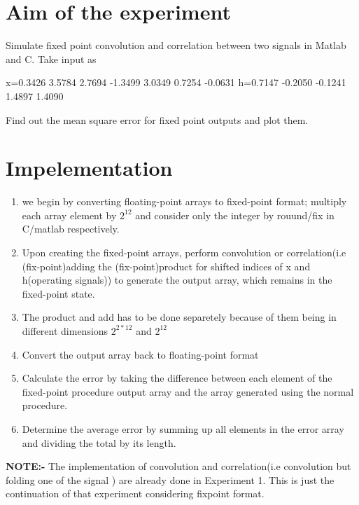 \documentclass[journal,12pt,onecolumn]{IEEEtran}
\theoremstyle{remark}
\begin{document}
\section{Aim of the experiment}
Simulate fixed point convolution and correlation between two signals in Matlab and C. Take input as

x={0.3426    3.5784    2.7694   -1.3499    3.0349    0.7254   -0.0631}
h={0.7147   -0.2050   -0.1241    1.4897    1.4090}

Find out the mean square error for fixed point outputs and plot them.
\section{Impelementation}
\begin{enumerate}
\item we begin by converting floating-point arrays to fixed-point format; multiply each array element by $2^{12}$ and consider only the integer by rouund/fix in C/matlab respectively.
\item Upon creating the fixed-point arrays, perform convolution or correlation(i.e (fix-point)adding the (fix-point)product for shifted indices of x and h(operating signals)) to generate the output array, which remains in the fixed-point state.
\item The product and add has to be done separetely because of them being in different dimensions $2^{2*12}$ and $2^{12}$
\item Convert the output array back to floating-point format
\item Calculate the error by taking the difference between each element of the fixed-point procedure output array and the array generated using the normal procedure.
\item Determine the average error by summing up all elements in the error array and dividing the total by its length.
\end{enumerate} 
\textbf{NOTE:-} The implementation of convolution and correlation(i.e convolution but folding one of the signal ) are already done in Experiment 1. This is just the continuation  of that experiment considering fixpoint format.
\end{document}
